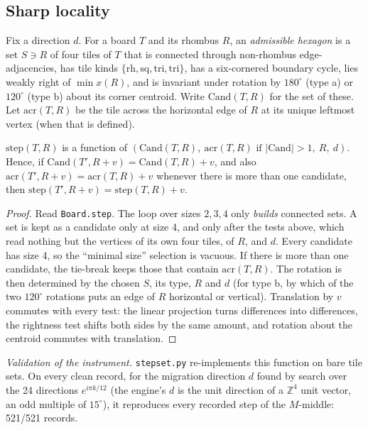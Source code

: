 \documentclass[11pt]{article}
\theoremstyle{definition}\newtheorem{definition}[theorem]{Definition}\newtheorem{remark}[theorem]{Remark}
\begin{document}
\subsection{Sharp locality}
Fix a direction $d$. For a board $T$ and its rhombus $R$, an \emph{admissible hexagon} is a set $S\ni R$ of four tiles of $T$ that is connected through non-rhombus edge-adjacencies, has tile kinds $\{\mathrm{rh},\mathrm{sq},\mathrm{tri},\mathrm{tri}\}$,
has a six-cornered boundary cycle, lies weakly right of $\min x(R)$, and is invariant under rotation by $180^\circ$ (type a) or $120^\circ$ (type b) about its corner centroid. Write $\mathrm{Cand}(T,R)$ for the set of these.
Let $\mathrm{acr}(T,R)$ be the tile across the horizontal edge of $R$ at its unique leftmost vertex (when that is defined).
\begin{proposition}\label{prop:cand}
$\mathrm{step}(T,R)$ is a function of $(\mathrm{Cand}(T,R),\ \mathrm{acr}(T,R)\text{ if }|\mathrm{Cand}|>1,\ R,\ d)$. Hence, if $\mathrm{Cand}(T',R+v)=\mathrm{Cand}(T,R)+v$, and also $\mathrm{acr}(T',R+v)=\mathrm{acr}(T,R)+v$ whenever there is more than one candidate, then $\mathrm{step}(T',R+v)=\mathrm{step}(T,R)+v$.
\end{proposition}
\begin{proof}
Read \texttt{Board.step}. The loop over sizes $2,3,4$ only \emph{builds} connected sets. A set is kept as a candidate only at size 4, and only after the tests above, which read nothing but the vertices of its own four tiles, of $R$, and $d$.
Every candidate has size 4, so the ``minimal size'' selection is vacuous. If there is more than one candidate, the tie-break keeps those that contain $\mathrm{acr}(T,R)$. The rotation is then determined by the chosen $S$, its type, $R$ and $d$
(for type b, by which of the two $120^\circ$ rotations puts an edge of $R$ horizontal or vertical). Translation by $v$ commutes with every test: the linear projection turns differences into differences, the rightness test shifts both sides by the same amount, and rotation about the centroid commutes with translation.
\end{proof}
\noindent\emph{Validation of the instrument.} \texttt{stepset.py} re-implements this function on bare tile sets. On every clean record, for the migration direction $d$ found by search over the 24 directions $e^{i\pi k/12}$
(the engine's $d$ is the unit direction of a $\mathbb Z^4$ unit vector, an odd multiple of $15^\circ$), it reproduces every recorded step of the $M$-middle: 521/521 records.
\end{document}
